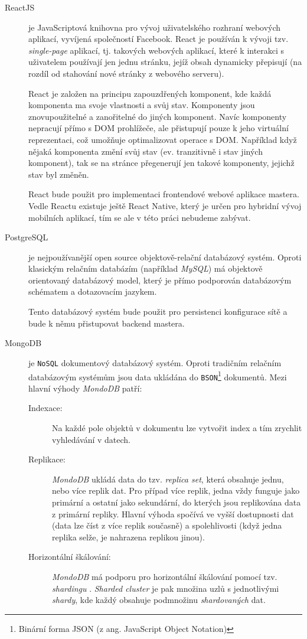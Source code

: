 \begin{description}
    \item[ReactJS] je JavaScriptová knihovna pro vývoj uživatelského rozhraní webových aplikací, vyvíjená společností Facebook. React je používán k vývoji tzv. \textit{single-page} aplikací, tj. takových webových aplikací, které k interakci s uživatelem používají jen jednu stránku, jejíž obsah dynamicky přepisují (na rozdíl od stahování nové stránky z webového serveru).
    
    React je založen na principu zapouzdřených komponent, kde každá komponenta ma svoje vlastnosti a svůj stav. Komponenty jsou znovupoužitelné a zanořitelné do jiných komponent. Navíc komponenty nepracují přímo s DOM prohlížeče, ale přistupují pouze k jeho virtuální reprezentaci, což umožňuje optimalizovat operace s DOM. Například když nějaká komponenta změní svůj stav (ev. tranzitivně i stav jiných komponent), tak se na stránce přegenerují jen takové komponenty, jejichž stav byl změněn.

    React bude použit pro implementaci frontendové webové aplikace mastera. Vedle Reactu existuje ještě React Native, který je určen pro hybridní vývoj mobilních aplikací, tím se ale v této práci nebudeme zabývat.
    
    \item[PostgreSQL] je nejpoužívanější open source objektově-relační databázový systém. Oproti klasickým relačním databázím (například \textit{MySQL}) má objektově orientovaný databázový model, který je přímo podporován databázovým schématem a dotazovacím jazykem.
    
    Tento databázový systém bude použit pro persistenci konfigurace sítě a bude k němu přistupovat backend mastera.
    
    \item[MongoDB]\label{chap:arch:technologie:mongodb} je \texttt{NoSQL} dokumentový databázový systém. Oproti tradičním relačním databázovým systémům jsou data ukládána do \texttt{BSON}\footnote{Binární forma JSON (z ang. JavaScript Object Notation)} dokumentů. Mezi hlavní výhody \textit{MondoDB} patří:

    \begin{description}
        \item[Indexace:] Na každé pole objektů v dokumentu lze vytvořit index a tím zrychlit vyhledávání v datech.
        \item[Replikace:] \textit{MondoDB} ukládá data do tzv. \textit{replica set}, která obsahuje jednu, nebo více replik dat. Pro případ více replik, jedna vždy funguje jako primární a ostatní jako sekundární, do kterých jsou replikována data z primární repliky. Hlavní výhoda spočívá ve vyšší dostupnosti dat (data lze číst z více replik současně) a spolehlivosti (když jedna replika selže, je nahrazena replikou jinou).
        \item[Horizontální škálování:] \textit{MondoDB} má podporu pro horizontální škálování pomocí tzv. \textit{shardingu} \cite{mongodb-scale}. \textit{Sharded cluster} je pak množina uzlů s jednotlivými \textit{shardy}, kde každý obsahuje podmnožinu \textit{shardovaných} dat.
    \end{description}

\end{description}